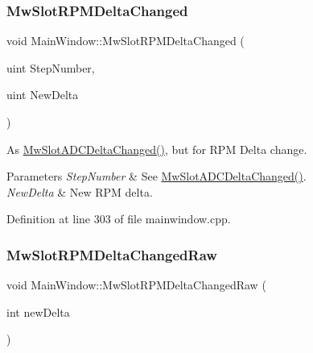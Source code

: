 \mbox{\label{class_main_window_a32b3a311b7151092db3ec0756d2c22d4}} 
\subsubsection{\texorpdfstring{Mw\+Slot\+R\+P\+M\+Delta\+Changed}{MwSlotRPMDeltaChanged}}
{\footnotesize\ttfamily void Main\+Window\+::\+Mw\+Slot\+R\+P\+M\+Delta\+Changed (\begin{DoxyParamCaption}\item[{uint}]{Step\+Number,  }\item[{uint}]{New\+Delta }\end{DoxyParamCaption})\hspace{0.3cm}{\ttfamily [slot]}}



As \hyperlink{class_main_window_a5778840f76f8ce6edd63d84b57b801b1}{Mw\+Slot\+A\+D\+C\+Delta\+Changed()}, but for R\+PM Delta change. 


\begin{DoxyParams}{Parameters}
{\em Step\+Number} & See \hyperlink{class_main_window_a5778840f76f8ce6edd63d84b57b801b1}{Mw\+Slot\+A\+D\+C\+Delta\+Changed()}. \\
\hline
{\em New\+Delta} & New R\+PM delta. \\
\hline
\end{DoxyParams}


Definition at line 303 of file mainwindow.\+cpp.

\mbox{\label{class_main_window_a4480e7516f91b93c8abc3d42c1284124}} 
\subsubsection{\texorpdfstring{Mw\+Slot\+R\+P\+M\+Delta\+Changed\+Raw}{MwSlotRPMDeltaChangedRaw}}
{\footnotesize\ttfamily void Main\+Window\+::\+Mw\+Slot\+R\+P\+M\+Delta\+Changed\+Raw (\begin{DoxyParamCaption}\item[{int}]{new\+Delta }\end{DoxyParamCaption})\hspace{0.3cm}{\ttfamily [slot]}}



